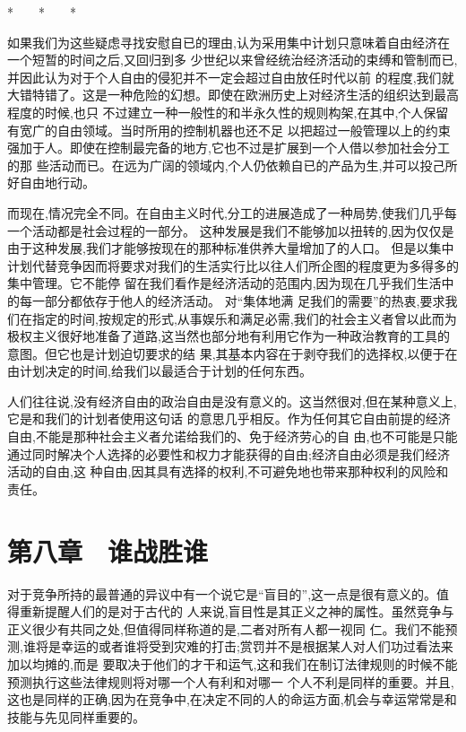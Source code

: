 ﻿\documentclass[12pt]{article}
\begin{document}
*　　*　　*

如果我们为这些疑虑寻找安慰自已的理由,认为采用集中计划只意味着自由经济在一个短暂的时间之后,又回归到多
少世纪以来曾经统治经济活动的束缚和管制而已,并因此认为对于个人自由的侵犯并不一定会超过自由放任时代以前
的程度,我们就大错特错了。这是一种危险的幻想。即使在欧洲历史上对经济生活的组织达到最高程度的时候,也只
不过建立一种一般性的和半永久性的规则构架,在其中,个人保留有宽广的自由领域。当时所用的控制机器也还不足
以把超过一般管理以上的约束强加于人。即使在控制最完备的地方,它也不过是扩展到一个人借以参加社会分工的那
些活动而已。在远为广阔的领域内,个人仍依赖自已的产品为生,并可以投己所好自由地行动。

而现在,情况完全不同。在自由主义时代,分工的进展造成了一种局势,使我们几乎每一个活动都是社会过程的一部分。
这种发展是我们不能够加以扭转的,因为仅仅是由于这种发展,我们才能够按现在的那种标准供养大量增加了的人口。
但是以集中计划代替竞争因而将要求对我们的生活实行比以往人们所企图的程度更为多得多的集中管理。它不能停
留在我们看作是经济活动的范围内,因为现在几乎我们生活中的每一部分都依存于他人的经济活动。 对``集体地满
足我们的需要''的热衷,要求我们在指定的时间,按规定的形式,从事娱乐和满足必需,我们的社会主义者曾以此而为
极权主义很好地准备了道路,这当然也部分地有利用它作为一种政治教育的工具的意图。但它也是计划迫切要求的结
果,其基本内容在于剥夺我们的选择权,以便于在由计划决定的时间,给我们以最适合于计划的任何东西。

人们往往说,没有经济自由的政治自由是没有意义的。这当然很对,但在某种意义上,它是和我们的计划者使用这句话
的意思几乎相反。作为任何其它自由前提的经济自由,不能是那种社会主义者允诺给我们的、免于经济劳心的自
由,也不可能是只能通过同时解决个人选择的必要性和权力才能获得的自由;经济自由必须是我们经济活动的自由,这
种自由,因其具有选择的权利,不可避免地也带来那种权利的风险和责任。

\section{第八章　谁战胜谁}


对于竞争所持的最普通的异议中有一个说它是``盲目的'',这一点是很有意义的。值得重新提醒人们的是对于古代的
人来说,盲目性是其正义之神的属性。虽然竞争与正义很少有共同之处,但值得同样称道的是,二者对所有人都一视同
仁。我们不能预测,谁将是幸运的或者谁将受到灾难的打击;赏罚并不是根据某人对人们功过看法来加以均摊的,而是
要取决于他们的才干和运气,这和我们在制订法律规则的时候不能预测执行这些法律规则将对哪一个人有利和对哪一
个人不利是同样的重要。并且,这也是同样的正确,因为在竞争中,在决定不同的人的命运方面,机会与幸运常常是和
技能与先见同样重要的。
\end{document}
